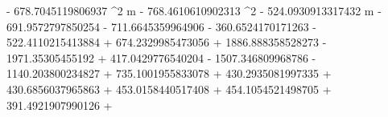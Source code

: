 - 678.7045119806937 \Delta^{2} m - 768.4610610902313 \Delta^{2} - 524.0930913317432 \Delta m - 691.9572797850254 \Delta - 711.6645359964906 \log{\left(\Delta + 1 \right)} - 360.6524170171263 \sin{\left(\Delta \right)} - 522.4110215413884 \sin{\left(4 \Delta \right)} + 674.2329985473056 \sin{\left(5 \Delta \right)} + 1886.888358528273 \sin{\left(6 \Delta \right)} - 1971.35305455192 \sin{\left(7 \Delta \right)} + 417.0429776540204 \sin{\left(8 \Delta \right)} - 1507.346809968786 \cos{\left(3 \Delta \right)} - 1140.203800234827 \cos{\left(4 \Delta \right)} + 735.1001955833078 \cos{\left(5 \Delta \right)} + 430.2935081997335 \cos{\left(6 \Delta \right)} + 430.6856037965863 \cos{\left(7 \Delta \right)} + 453.0158440517408  + 454.1054521498705  + 391.4921907990126  + 
